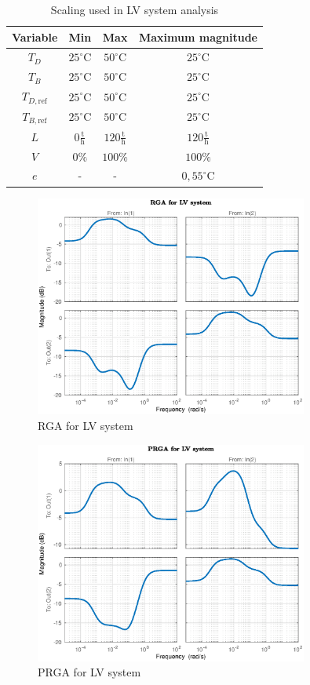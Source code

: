 \documentclass[12pt]{article}
\begin{document}
\begin{table}
\centering
\begin{tabular}{c | c | c | c}
Variable & Min & Max & Maximum magnitude \\ \hline
$T_D$ & $25^\circ$C & $50^\circ$C & $25^\circ$C \\
$T_B$ & $25^\circ$C & $50^\circ$C & $25^\circ$C \\
$T_{D, \textrm{ref}}$ & $25^\circ$C & $50^\circ$C & $25^\circ$C \\
$T_{B, \textrm{ref}}$ & $25^\circ$C & $50^\circ$C & $25^\circ$C \\
$L$ & $0 \frac{\textrm{t}}{\textrm{h}}$ & $120 \frac{\textrm{t}}{\textrm{h}}$ & $120 \frac{\textrm{t}}{\textrm{h}}$ \\
$V$ & $0\%$ & $100\%$ & $100\%$ \\
$e$ & - & - & $0,55^\circ$C
\end{tabular}
\caption{Scaling used in LV system analysis}
\label{tab:LV_scaling}
\end{table}

\begin{figure}[p]
\centering
\includegraphics[width=0.8\textwidth]{../Systemanalyse/Log_Data_to_Matlab/Figurer/LV_identifisering/LV_RGA.eps}
\caption{RGA for LV system}
\label{fig:LV_RGA}
\end{figure}

\begin{figure}[p]
\centering
\includegraphics[width=0.8\textwidth]{../Systemanalyse/Log_Data_to_Matlab/Figurer/LV_identifisering/LV_PRGA.eps}
\caption{PRGA for LV system}
\label{fig:LV_PRGA}
\end{figure}
\end{document}

